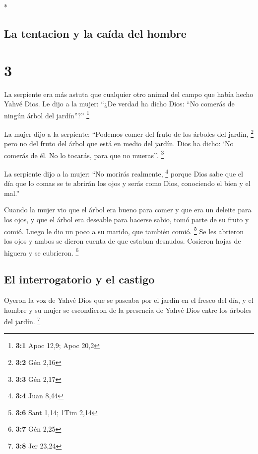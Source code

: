 \begin{paracol}{2}
\begin{otherlanguage}{english}
\end{otherlanguage}

\switchcolumn[0]*

\hypertarget{la-tentacion-y-la-cauxedda-del-hombre}{%
\subsection{La tentacion y la caída del
hombre}\label{la-tentacion-y-la-cauxedda-del-hombre}}

\hypertarget{section-4}{%
\section{3}\label{section-4}}

 La serpiente era más astuta que cualquier otro animal del
campo que había hecho Yahvé Dios. Le dijo a la mujer: ``¿De verdad ha
dicho Dios: ``No comerás de ningún árbol del jardín''?'' \footnote{\textbf{3:1}
  Apoc 12,9; Apoc 20,2}

 La mujer dijo a la serpiente: ``Podemos comer del fruto
de los árboles del jardín, \footnote{\textbf{3:2} Gén 2,16}
 pero no del fruto del árbol que está en medio del jardín.
Dios ha dicho: `No comerás de él. No lo tocarás, para que no mueras''.
\footnote{\textbf{3:3} Gén 2,17}

 La serpiente dijo a la mujer: ``No morirás realmente,
\footnote{\textbf{3:4} Juan 8,44}  porque Dios sabe que el
día que lo comas se te abrirán los ojos y serás como Dios, conociendo el
bien y el mal.''

 Cuando la mujer vio que el árbol era bueno para comer y
que era un deleite para los ojos, y que el árbol era deseable para
hacerse sabio, tomó parte de su fruto y comió. Luego le dio un poco a su
marido, que también comió. \footnote{\textbf{3:6} Sant 1,14; 1Tim 2,14}
 Se les abrieron los ojos y ambos se dieron cuenta de que
estaban desnudos. Cosieron hojas de higuera y se cubrieron. \footnote{\textbf{3:7}
  Gén 2,25}

\hypertarget{el-interrogatorio-y-el-castigo}{%
\subsection{El interrogatorio y el
castigo}\label{el-interrogatorio-y-el-castigo}}

 Oyeron la voz de Yahvé Dios que se paseaba por el jardín
en el fresco del día, y el hombre y su mujer se escondieron de la
presencia de Yahvé Dios entre los árboles del jardín. \footnote{\textbf{3:8}
  Jer 23,24}


\end{paracol}
